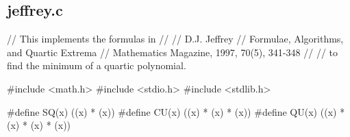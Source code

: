 \documentclass[
  12pt,
  letterpaper,
  DIV=11,
  numbers=noendperiod]{scrreprt}
\newenvironment{Shaded}{\begin{snugshade}}{\end{snugshade}}
\newcommand{\CommentTok}[1]{\textcolor[rgb]{0.37,0.37,0.37}{#1}}
\newcommand{\ImportTok}[1]{\textcolor[rgb]{0.00,0.46,0.62}{#1}}
\newcommand{\OperatorTok}[1]{\textcolor[rgb]{0.37,0.37,0.37}{#1}}
\newcommand{\PreprocessorTok}[1]{\textcolor[rgb]{0.68,0.00,0.00}{#1}}
\theoremstyle{remark}
\begin{document}
\subsection*{jeffrey.c}\label{jeffrey.c}

\begin{Shaded}
\begin{Highlighting}[]
\CommentTok{// This implements the formulas in}
\CommentTok{//}
\CommentTok{// D.J. Jeffrey}
\CommentTok{// Formulae, Algorithms, and Quartic Extrema}
\CommentTok{// Mathematics Magazine, 1997, 70(5), 341{-}348}
\CommentTok{//}
\CommentTok{// to find the minimum of a quartic polynomial.}

\PreprocessorTok{\#include }\ImportTok{\textless{}math.h\textgreater{}}
\PreprocessorTok{\#include }\ImportTok{\textless{}stdio.h\textgreater{}}
\PreprocessorTok{\#include }\ImportTok{\textless{}stdlib.h\textgreater{}}

\PreprocessorTok{\#define SQ}\OperatorTok{(}\PreprocessorTok{x}\OperatorTok{)}\PreprocessorTok{ }\OperatorTok{((}\PreprocessorTok{x}\OperatorTok{)}\PreprocessorTok{ }\OperatorTok{*}\PreprocessorTok{ }\OperatorTok{(}\PreprocessorTok{x}\OperatorTok{))}
\PreprocessorTok{\#define CU}\OperatorTok{(}\PreprocessorTok{x}\OperatorTok{)}\PreprocessorTok{ }\OperatorTok{((}\PreprocessorTok{x}\OperatorTok{)}\PreprocessorTok{ }\OperatorTok{*}\PreprocessorTok{ }\OperatorTok{(}\PreprocessorTok{x}\OperatorTok{)}\PreprocessorTok{ }\OperatorTok{*}\PreprocessorTok{ }\OperatorTok{(}\PreprocessorTok{x}\OperatorTok{))}
\PreprocessorTok{\#define QU}\OperatorTok{(}\PreprocessorTok{x}\OperatorTok{)}\PreprocessorTok{ }\OperatorTok{((}\PreprocessorTok{x}\OperatorTok{)}\PreprocessorTok{ }\OperatorTok{*}\PreprocessorTok{ }\OperatorTok{(}\PreprocessorTok{x}\OperatorTok{)}\PreprocessorTok{ }\OperatorTok{*}\PreprocessorTok{ }\OperatorTok{(}\PreprocessorTok{x}\OperatorTok{)}\PreprocessorTok{ }\OperatorTok{*}\PreprocessorTok{ }\OperatorTok{(}\PreprocessorTok{x}\OperatorTok{))}


\end{Highlighting}
\end{Shaded}
\end{document}
